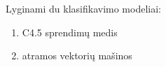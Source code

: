 
Lyginami du klasifikavimo modeliai:
\begin{enumerate}
\item C4.5 sprendimų medis
\item atramos vektorių mašinos
\end{enumerate}



